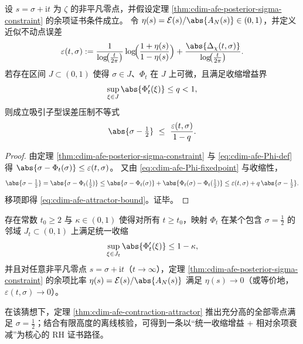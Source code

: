 \begin{theorem}[临界线吸引子的可检验收缩准则]\label{thm:cdim-afe-contraction-attractor}
设 \(s=\sigma+\mathrm{i}t\) 为 \(\zeta\) 的非平凡零点，并假设定理 \ref{thm:cdim-afe-posterior-sigma-constraint} 的余项证书条件成立。
令 \(\eta(s)=\mathcal{E}(s)/\abs{A_N(s)}\in(0,1)\)，并定义近似不动点误差
\begin{equation}\label{eq:cdim-afe-epsilon-def}
\varepsilon(t,\sigma):=
\frac{1}{\log\!\bigl(\tfrac{t}{2\pi}\bigr)}
\log\!\Bigl(\frac{1+\eta(s)}{1-\eta(s)}\Bigr)
+
\frac{\abs{\Delta_\chi(t,\sigma)}}{\log\!\bigl(\tfrac{t}{2\pi}\bigr)}.
\end{equation}
若存在区间 \(J\subset(0,1)\) 使得 \(\sigma\in J\)、\(\Phi_t\) 在 \(J\) 上可微，且满足收缩增益界
\[
\sup_{\xi\in J}\abs{\Phi_t'(\xi)}\le q<1,
\]
则成立吸引子型误差压制不等式
\begin{equation}\label{eq:cdim-afe-attractor-bound}
\abs{\sigma-\tfrac12}\ \le\ \frac{\varepsilon(t,\sigma)}{1-q}.
\end{equation}
\end{theorem}
\begin{proof}
由定理 \ref{thm:cdim-afe-posterior-sigma-constraint} 与 \eqref{eq:cdim-afe-Phi-def} 得
\(
\abs{\sigma-\Phi_t(\sigma)}\le \varepsilon(t,\sigma)
\)。
又由 \eqref{eq:cdim-afe-Phi-fixedpoint} 与收缩性，
\[
\abs{\sigma-\tfrac12}
=\abs{\sigma-\Phi_t(\tfrac12)}
\le \abs{\sigma-\Phi_t(\sigma)}+\abs{\Phi_t(\sigma)-\Phi_t(\tfrac12)}
\le \varepsilon(t,\sigma)+q\,\abs{\sigma-\tfrac12}.
\]
移项即得 \eqref{eq:cdim-afe-attractor-bound}。证毕。
\end{proof}

\begin{conjecture}[统一收缩增益与黎曼猜想的动力学等价]\label{conj:cdim-afe-uniform-contraction-rh}
存在常数 \(t_0\ge 2\) 与 \(\kappa\in(0,1)\) 使得对所有 \(t\ge t_0\)，映射 \(\Phi_t\) 在某个包含 \(\sigma=\tfrac12\) 的邻域 \(J_t\subset(0,1)\) 上满足统一收缩
\[
\sup_{\xi\in J_t}\abs{\Phi_t'(\xi)}\le 1-\kappa,
\]
并且对任意非平凡零点 \(s=\sigma+\mathrm{i}t\)（\(t\to\infty\)），定理 \ref{thm:cdim-afe-posterior-sigma-constraint} 的余项比率 \(\eta(s)=\mathcal{E}(s)/\abs{A_N(s)}\) 满足 \(\eta(s)\to 0\)（或等价地，\(\varepsilon(t,\sigma)\to 0\)）。
\par
在该猜想下，定理 \ref{thm:cdim-afe-contraction-attractor} 推出充分高的全部零点满足 \(\sigma=\tfrac12\)；结合有限高度的离线核验，可得到一条以“统一收缩增益 + 相对余项衰减”为核心的 RH 证书路径。
\end{conjecture}

